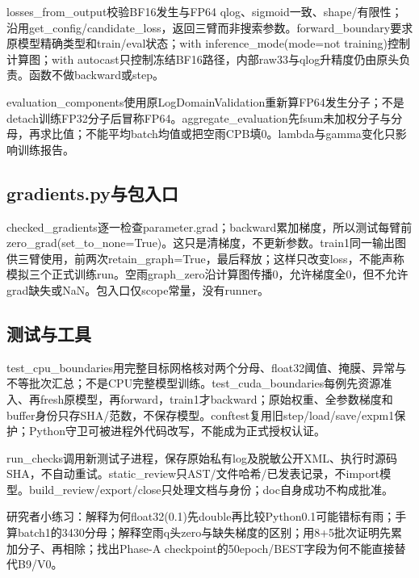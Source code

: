 \documentclass[UTF8,fontset=fandol,10pt]{ctexart}
\begin{document}
losses\_\allowbreak{}from\_\allowbreak{}output校验BF16发生与FP64 qlog、sigmoid一致、shape/\allowbreak{}有限性；沿用get\_\allowbreak{}config/\allowbreak{}candidate\_\allowbreak{}loss，返回三臂而非搜索参数。forward\_\allowbreak{}boundary要求原模型精确类型和train/\allowbreak{}eval状态；with inference\_\allowbreak{}mode(mode=not training)控制计算图；with autocast只控制冻结BF16路径，内部raw33与qlog升精度仍由原头负责。函数不做backward或step。

evaluation\_\allowbreak{}components使用原LogDomainValidation重新算FP64发生分子；不是detach训练FP32分子后冒称FP64。aggregate\_\allowbreak{}evaluation先fsum未加权分子与分母，再求比值；不能平均batch均值或把空雨CPB填0。lambda与gamma变化只影响训练报告。

\subsection{gradients.py与包入口}

checked\_\allowbreak{}gradients逐一检查parameter.grad；backward累加梯度，所以测试每臂前zero\_\allowbreak{}grad(set\_\allowbreak{}to\_\allowbreak{}none=True)。这只是清梯度，不更新参数。train1同一输出图供三臂使用，前两次retain\_\allowbreak{}graph=True，最后释放；这样只改变loss，不能声称模拟三个正式训练run。空雨graph\_\allowbreak{}zero沿计算图传播0，允许梯度全0，但不允许grad缺失或NaN。包入口仅scope常量，没有runner。

\subsection{测试与工具}

test\_\allowbreak{}cpu\_\allowbreak{}boundaries用完整目标网格核对两个分母、float32阈值、掩膜、异常与不等批次汇总；不是CPU完整模型训练。test\_\allowbreak{}cuda\_\allowbreak{}boundaries每例先资源准入、再fresh原模型，再forward，train1才backward；原始权重、全参数梯度和buffer身份只存SHA/\allowbreak{}范数，不保存模型。conftest复用旧step/\allowbreak{}load/\allowbreak{}save/\allowbreak{}expm1保护；Python守卫可被进程外代码改写，不能成为正式授权认证。

run\_\allowbreak{}checks调用新测试子进程，保存原始私有log及脱敏公开XML、执行时源码SHA，不自动重试。static\_\allowbreak{}review只AST/\allowbreak{}文件哈希/\allowbreak{}已发表记录，不import模型。build\_\allowbreak{}review/\allowbreak{}export/\allowbreak{}close只处理文档与身份；doc自身成功不构成批准。

研究者小练习：解释为何float32(0.1)先double再比较Python0.1可能错标有雨；手算batch1的3430分母；解释空雨q头zero与缺失梯度的区别；用8+5批次证明先累加分子、再相除；找出Phase-A checkpoint的50epoch/\allowbreak{}BEST字段为何不能直接替代B9/\allowbreak{}V0。
\end{document}
